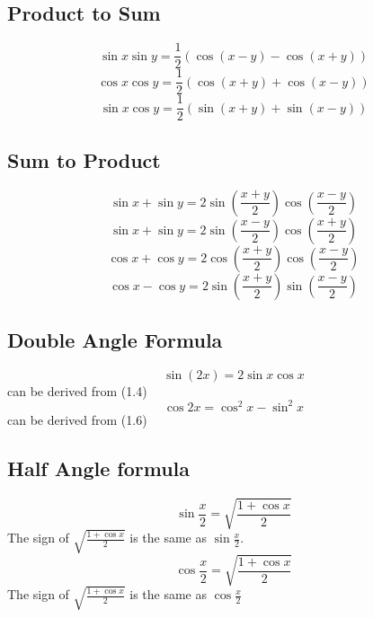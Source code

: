 \documentclass{article}
\begin{document}
\subsection{Product to Sum}
\begin{equation}
    \sin x \sin y = \frac{1}{2}(\cos(x-y)-\cos(x+y))
\end{equation}
\begin{equation}
    \cos x \cos y = \frac{1}{2}(\cos(x+y)+\cos(x-y))
\end{equation}
\begin{equation}
    \sin x \cos y = \frac{1}{2}(\sin(x+y)+\sin(x-y))
\end{equation}

\subsection{Sum to Product}
\begin{equation}
    \sin x + \sin y = 2 \sin(\frac{x+y}{2})\cos(\frac{x-y}{2})
\end{equation}
\begin{equation}
    \sin x + \sin y = 2 \sin(\frac{x-y}{2})\cos(\frac{x+y}{2})
\end{equation}
\begin{equation}
    \cos x + \cos y = 2 \cos(\frac{x+y}{2}) \cos(\frac{x-y}{2})
\end{equation}
\begin{equation}
    \cos x - \cos y = 2 \sin(\frac{x+y}{2})\sin(\frac{x-y}{2})
\end{equation}

\subsection{Double Angle Formula}
\begin{equation}
    \sin (2x) = 2 \sin x \cos x
\end{equation}
can be derived from (1.4)
\begin{equation}
    \cos 2x = \cos^2x-\sin^2x
\end{equation}
can be derived from (1.6)

\subsection{Half Angle formula}
\begin{equation}
    \sin \frac{x}{2} = \sqrt{\frac{1 + \cos x}{2}}
\end{equation}
The sign of $\sqrt{\frac{1 + \cos x}{2}}$ is the same as $\sin \frac{x}{2}$.
\begin{equation}
    \cos \frac{x}{2} = \sqrt{\frac{1 + \cos x}{2}}
\end{equation}
The sign of $\sqrt{\frac{1 + \cos x}{2}}$ is the same as $\cos \frac{x}{2}$
\end{document}

